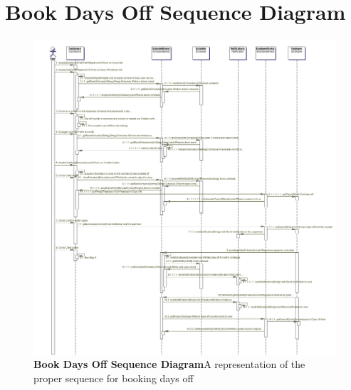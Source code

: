 \documentclass[letterpaper,12pt]{report}
\begin{document}
\section{Book Days Off Sequence Diagram}
\begin{figure}[hbp]
 \includegraphics[scale=0.3]{diagrams/seqBookDaysOff.png}
 \caption{\small
\textbf{Book Days Off Sequence Diagram}\newline A representation of the proper sequence for booking days off}\label{fig:seqBookDaysOff}
\end{figure}
\newpage
\end{document}
